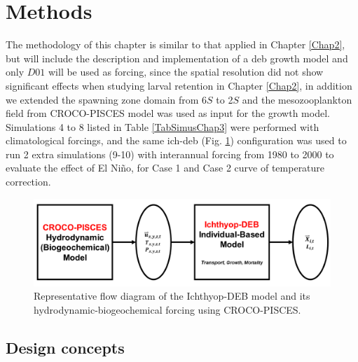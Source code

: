 \clearpage
\section{Methods}\label{Chap3Meth}
The methodology of this chapter is similar to that applied in Chapter \ref{Chap2}, but will include the description and implementation of a \acrshort{deb} growth model and only $D01$ will be used as forcing, since the spatial resolution did not show significant effects when studying larval
retention in Chapter \ref{Chap2}, in addition we extended the spawning zone domain from 6\textdegree $S$ to 2\textdegree $S$ and the mesozooplankton field from CROCO-PISCES model was used as input for the growth model. Simulations 4 to 8 listed in Table \ref{TabSimusChap3} were performed with climatological forcings, and the same \gls{ich-deb} (Fig. \ref{Chap3Ichthyop-DEB}) configuration was used to run 2 extra simulations (9-10) with interannual forcing from 1980 to 2000 to evaluate the effect of El Ni\~{n}o, for Case 1 and Case 2 curve of temperature correction.\\

\begin{figure}[ht]
	\includegraphics[width=1.0\textwidth]{figures/Chap3Ichthyop-DEB.png}
	\centering
	\caption{Representative flow diagram of the Ichthyop-DEB model and its hydrodynamic-biogeochemical forcing using CROCO-PISCES.}
	\label{Chap3Ichthyop-DEB}
\end{figure}

\subsection{Design concepts}

